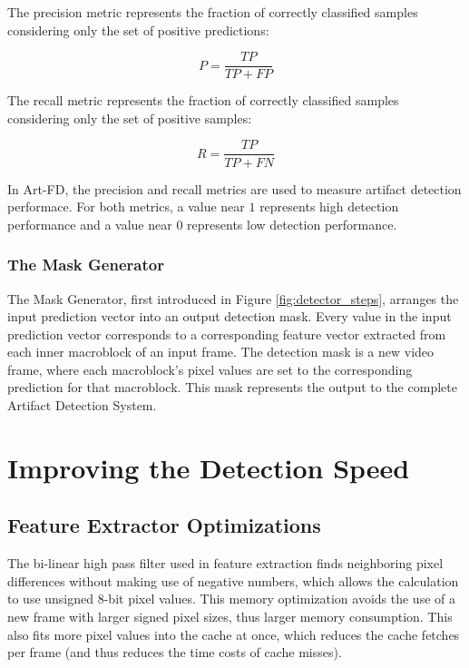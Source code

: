 The precision metric represents the fraction of correctly classified samples considering only the set of positive predictions:

\def\PRED{P}
\begin{equation}
  \label{eq:oob_error}
  \PRED = \frac{TP}{TP+FP}
\end{equation}

The recall metric represents the fraction of correctly classified samples considering only the set of positive samples:

\def\REC{R}
\begin{equation}
  \label{eq:oob_error}
  \REC = \frac{TP}{TP+FN}
\end{equation}

In Art-FD, the precision and recall metrics are used to measure artifact detection performace. For both metrics, a value near $1$ represents high detection performance and a value near $0$ represents low detection performance.

\subsubsection{The Mask Generator}
\label{sec:sol_maskgen}

The Mask Generator, first introduced in Figure \ref{fig:detector_steps}, arranges the input prediction vector into an output detection mask. Every value in the input prediction vector corresponds to a corresponding feature vector extracted from each inner macroblock of an input frame. The detection mask is a new video frame, where each macroblock's pixel values are set to the corresponding prediction for that macroblock. This mask represents the output to the complete Artifact Detection System.

\section{Improving the Detection Speed}
\label{sec:sol_speed}

\subsection{Feature Extractor Optimizations}
The bi-linear high pass filter used in feature extraction finds neighboring pixel differences without making use of negative numbers, which allows the calculation to use unsigned 8-bit pixel values. This memory optimization avoids the use of a new frame with larger signed pixel sizes, thus larger memory consumption. This also fits more pixel values into the cache at once, which reduces the cache fetches per frame (and thus reduces the time costs of cache misses).

